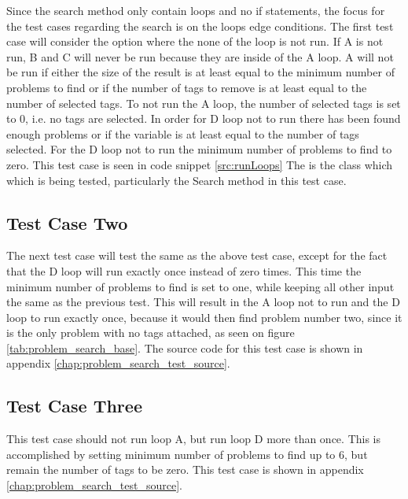 Since the search method only contain loops and no if statements, the focus for the test cases regarding the search is on the loops edge conditions.
The first test case will consider the option where the none of the loop is not run.
If A is not run, B and C will never be run because they are inside of the A loop.
A will not be run if either the size of the result is at least equal to the minimum number of problems to find or if the number of tags to remove is at least equal to the number of selected tags.
To not run the A loop, the number of selected tags is set to 0, i.e. no tags are selected.
In order for D loop not to run there has been found enough problems or if the  variable is at least equal to the number of tags selected.
For the D loop not to run the minimum number of problems to find to zero.
This test case is seen in code snippet \ref{src:runLoops}
The  is the class which which is being tested, particularly the Search method in this test case.

\subsection{Test Case Two}
The next test case will test the same as the above test case, except for the fact that the D loop will run exactly once instead of zero times.
This time the minimum number of problems to find is set to one, while keeping all other input the same as the previous test.
This will result in the A loop not to run and the D loop to run exactly once, because it would then find problem number two, since it is the only problem with no tags attached, as seen on figure \ref{tab:problem_search_base}.
The source code for this test case is shown in appendix \ref{chap:problem_search_test_source}.

\subsection{Test Case Three}
This test case should not run loop A, but run loop D more than once.
This is accomplished by setting minimum number of problems to find up to 6, but remain the number of tags to be zero.
This test case is shown in appendix \ref{chap:problem_search_test_source}.

